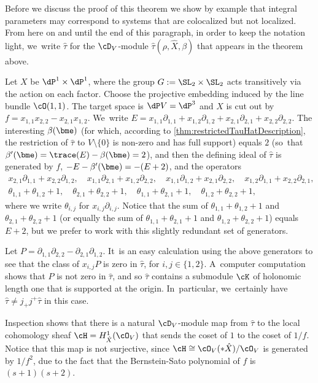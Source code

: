 Before we discuss the proof of this theorem we show by example that integral parameters may correspond to systems that are colocalized but not localized. From here on and until the end of this paragraph, in order to keep the notation light, we~write $\hat\tau$ for the $\cD_V$\nobreakdash-mod\-ule
$\hat{\tau}(\rho, \hat{X}, \beta)$ that appears in the theorem above.

\begin{exa}\label{ex:Coloc}
Let $X$ be $\dP^1\times \dP^1$, where the group $G:=\SL_2\times\SL_2$ acts transitively via the action on each factor. Choose the projective embedding induced by the line bundle $\cO(1,1)$. The target space is $\dP V=\dP^3$ and $X$ is cut out by $f=x_{1,1}x_{2,2}-x_{2,1}x_{1,2}$. We~write
$E=x_{1,1}\partial_{1,1}+x_{1,2}\partial_{1,2}+
x_{2,1}\partial_{2,1}+x_{2,2}\partial_{2,2}$.
The interesting $\beta(\bme)$ (for which, according to \cref{thm:restrictedTauHatDescription}, the restriction of $\hat\tau$ to $V\setminus\{0\}$ is non-zero and has full support) equals $2$
(so~that $\beta'(\bme)=\trace(E)-\beta(\bme)=2$), and then the defining ideal of $\hat \tau$ is generated by $f$, $-E-\beta'(\bme)=-(E+2)$, and the operators
\begin{gather*}
x_{2,1}\partial_{1,1}+x_{2,2}\partial_{1,2},\quad x_{1,1}\partial_{2,1}+x_{1,2}\partial_{2,2},\quad x_{1,1}\partial_{1,2}+x_{2,1}\partial_{2,2},\quad x_{1,2}\partial_{1,1}+x_{2,2}\partial_{2,1},\\
\theta_{1,1}+\theta_{1,2}+1,\quad
\theta_{2,1}+\theta_{2,2}+1,\quad
\theta_{1,1}+\theta_{2,1}+1,\quad
\theta_{1,2}+\theta_{2,2}+1,
\end{gather*}
where we write $\theta_{i,j}$ for $x_{i,j}\partial_{i,j}$. Notice that the sum of $\theta_{1,1}+\theta_{1,2}+1$ and $\theta_{2,1}+\theta_{2,2}+1$ (or equally the sum of $\theta_{1,1}+\theta_{2,1}+1$ and $\theta_{1,2}+\theta_{2,2}+1$) equals $E+2$, but we prefer to work with this slightly redundant set of generators.

Let $P=\partial_{1,1}\partial_{2,2}-\partial_{2,1}\partial_{1,2}$. It~is an easy calculation using the above generators to see that the class of $x_{i,j}P$ is zero in $\hat\tau$, for $i,j\in\{1,2\}$. A~computer computation shows that $P$ is not zero in $\hat\tau$, and so $\hat\tau$ contains a submodule $\cK$ of holonomic length one that is supported at the origin. In~particular, we~certainly have $\hat{\tau}\neq j_+j^+\hat{\tau}$ in this case.

Inspection shows that there is a natural $\cD_V$\nobreakdash-mod\-ule map from $\hat\tau$ to the local cohomology sheaf $\cH=H^1_{\hat X}(\cO_V)$ that sends the coset of $1$ to the coset of $1/f$. Notice that this map is not surjective, since $\cH \cong \cO_V(*\hat{X})/\cO_V$ is generated by $1/f^2$, due to the fact that the Bernstein-Sato polynomial of $f$ is $(s+1)(s+2)$.


\end{exa}
